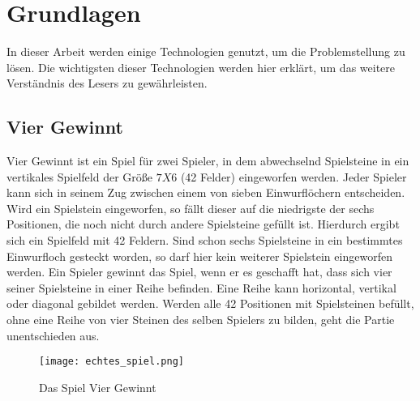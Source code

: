 \chapter{Grundlagen}%

\label{cha:Schluss}

In dieser Arbeit werden einige Technologien genutzt, um die Problemstellung zu lösen.
Die wichtigsten dieser Technologien werden hier erklärt, um das weitere Verständnis des Lesers zu gewährleisten. 


\section{Vier Gewinnt}
Vier Gewinnt ist ein Spiel für zwei Spieler, in dem abwechselnd Spielsteine in ein vertikales Spielfeld der Größe $7 X 6$ (42 Felder) eingeworfen werden. Jeder Spieler kann sich in seinem Zug zwischen einem von sieben Einwurflöchern entscheiden. Wird ein Spielstein eingeworfen, so fällt dieser auf die niedrigste der sechs Positionen, die noch nicht durch andere Spielsteine gefüllt ist. Hierdurch ergibt sich ein Spielfeld mit 42 Feldern.  Sind schon sechs Spielsteine in ein bestimmtes Einwurfloch gesteckt worden, so darf hier kein weiterer Spielstein eingeworfen werden. Ein Spieler gewinnt das Spiel, wenn er es geschafft  hat, dass sich vier seiner Spielsteine in einer Reihe befinden. Eine Reihe kann horizontal, vertikal oder diagonal gebildet werden. Werden alle 42 Positionen mit Spielsteinen befüllt, ohne eine Reihe von vier Steinen des selben Spielers zu bilden, geht die Partie unentschieden aus.
\begin{figure}[h!]
  \texttt{[image: echtes\_spiel.png]}
  \centering
  \caption{Das Spiel Vier Gewinnt \cite{connect4}}
  \label{fig:echtes_spiel}
\end{figure}



